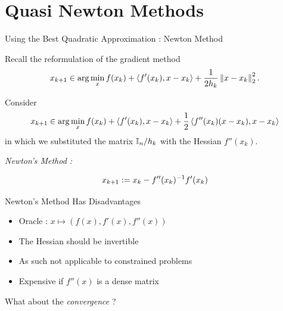 \documentclass[9pt]{beamer}
\begin{document}
\section{Quasi Newton Methods}

\begin{frame}{Using the Best Quadratic Approximation : Newton Method}

  Recall the reformulation of the gradient method
  \[
    x_{k+1 } \in \arg \min_{x} f(x_k) + \left<f'(x_k), x-x_k\right> + \frac{1}{2 h_k} \left\|x - x_k\right\|^2_2. 
  \]

  Consider
  \[
    x_{k+1 } \in \arg \min_{x} f(x_k) + \left<f'(x_k), x-x_k\right> + \frac{1}{2} \left<f''(x_k)(x - x_k), x - x_k\right>
  \]
  in which we substituted the matrix $\mathbb I_n/h_k$ with the Hessian $f''(x_k)$.

  \vfill

  \emph{Newton's Method :}
  \begin{center}
    \begin{tcolorbox}[width=0.7\textwidth]
      \[
        x_{k+1} := x_k - f''(x_k)^{-1} f'(x_k)
      \]
    \end{tcolorbox}
  \end{center}

\end{frame}


\begin{frame}{Newton's Method Has Disadvantages}

  \begin{itemize}
    \setlength\itemsep{1em}
  \item Oracle : $x\mapsto (f(x), f'(x) , f''(x))$
  \item The Hessian should be invertible
  \item As such not applicable to constrained problems
  \item Expensive if $f''(x)$ is a dense matrix
  \end{itemize}

  \vfill

  What about the \emph{convergence} ?
  
\end{frame}
\end{document}
